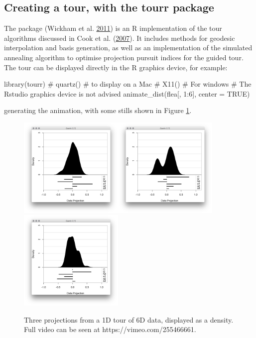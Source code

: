 \hypertarget{creating-a-tour-with-the-tourr-package}{%
\subsection{Creating a tour, with the tourr
package}\label{creating-a-tour-with-the-tourr-package}}

The  package (Wickham et al.
\protect\hyperlink{ref-tourr}{2011}) is an R implementation of the tour
algorithms discussed in Cook et al.
(\protect\hyperlink{ref-gt_pp_mc}{2007}). It includes methods for
geodesic interpolation and basis generation, as well as an
implementation of the simulated annealing algorithm to optimise
projection pursuit indices for the guided tour. The tour can be
displayed directly in the R graphics device, for example:

\begin{Schunk}
\begin{Sinput}
library(tourr)
# quartz() # to display on a Mac
# X11() # For windows
# The Rstudio graphics device is not advised
animate_dist(flea[, 1:6], center = TRUE)
\end{Sinput}
\end{Schunk}

generating the animation, with some stills shown in Figure \ref{tour}.

\begin{figure}[ht]
\centerline{\includegraphics[width=5cm]{figures/tour1.png}\includegraphics[width=5cm]{figures/tour2.png}\includegraphics[width=5cm]{figures/tour3.png}}
\caption{Three projections from a 1D tour of 6D data, displayed as a density. Full video can be seen at https://vimeo.com/255466661.}
\label{tour}
\end{figure}

